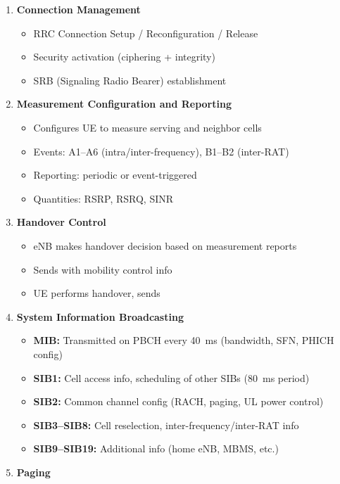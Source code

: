 \begin{enumerate}
\def\labelenumi{\arabic{enumi}.}
\tightlist
\item
  \textbf{Connection Management}

  \begin{itemize}
  \tightlist
  \item
    RRC Connection Setup /\allowbreak{} Reconfiguration /\allowbreak{} Release
  \item
    Security activation (ciphering + integrity)
  \item
    SRB (Signaling Radio Bearer) establishment
  \end{itemize}
\item
  \textbf{Measurement Configuration and Reporting}

  \begin{itemize}
  \tightlist
  \item
    Configures UE to measure serving and neighbor cells
  \item
    Events: A1–A6 (intra/\allowbreak{}inter-frequency), B1–B2 (inter-RAT)
  \item
    Reporting: periodic or event-triggered
  \item
    Quantities: RSRP, RSRQ, SINR
  \end{itemize}
\item
  \textbf{Handover Control}

  \begin{itemize}
  \tightlist
  \item
    eNB makes handover decision based on measurement reports
  \item
    Sends  with mobility control info
  \item
    UE performs handover, sends 
  \end{itemize}
\item
  \textbf{System Information Broadcasting}

  \begin{itemize}
  \tightlist
  \item
    \textbf{MIB:} Transmitted on PBCH every 40~ms (bandwidth, SFN, PHICH config)
  \item
    \textbf{SIB1:} Cell access info, scheduling of other SIBs (80~ms period)
  \item
    \textbf{SIB2:} Common channel config (RACH, paging, UL power control)
  \item
    \textbf{SIB3–SIB8:} Cell reselection, inter-frequency/\allowbreak{}inter-RAT info
  \item
    \textbf{SIB9–SIB19:} Additional info (home eNB, MBMS, etc.)
  \end{itemize}
\item
  \textbf{Paging}


\end{enumerate}
